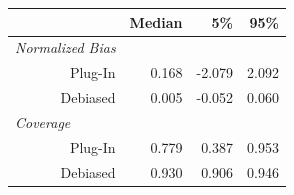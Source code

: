 
\begin{tabular}{r|rrr}
\toprule
  & Median & 5\% & 95\%\\
\midrule
\multicolumn{1}{l|}{\textit{Normalized Bias}}\\
Plug-In & 0.168 & -2.079 & 2.092\\
Debiased & 0.005 & -0.052 & 0.060\\
\midrule
\multicolumn{1}{l|}{\textit{Coverage}}\\
Plug-In & 0.779 & 0.387 & 0.953\\
Debiased & 0.930 & 0.906 & 0.946\\
\bottomrule
\end{tabular}
